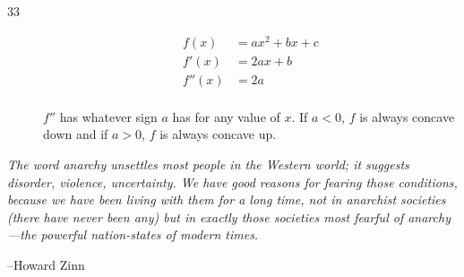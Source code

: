 \documentclass[fleqn]{exam}
\begin{document}
\begin{description}
\item[33]
\begin{align*}
  f(x)   &= ax^2 + bx + c \\
  f'(x)  &= 2ax + b \\
  f''(x) &= 2a \\
\end{align*}

$f''$ has whatever sign $a$ has for any value of $x$.  If $a < 0$, $f$ is always concave down and if $a > 0$, $f$ is always concave up.

\end{description}

\else

\vspace{4 cm}

{\em The word {\em anarchy} unsettles most people in the Western world;  it suggests disorder, violence, uncertainty.
  We have good reasons for fearing those conditions, because we have been living with them for a long time, not in
  anarchist societies (there have never been any) but in exactly those societies most fearful of anarchy---the powerful
  nation-states of modern times.}

\vspace{.2 cm}

\hspace{1 cm} --Howard Zinn

\fi
\end{document}
